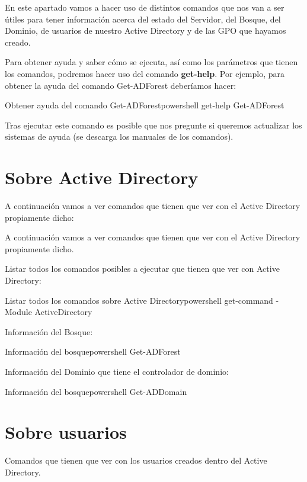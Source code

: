 En este apartado vamos a hacer uso de  distintos comandos que nos van a ser útiles para tener información acerca del estado del Servidor, del Bosque, del Dominio, de usuarios de nuestro Active Directory y de las GPO que hayamos creado.

Para obtener ayuda y saber cómo se ejecuta, así como los parámetros que tienen los comandos, podremos hacer uso del comando \textbf{get-help}. Por ejemplo, para obtener la ayuda del comando Get-ADForest deberíamos hacer:

\begin{mycode}{Obtener ayuda del comando Get-ADForest}{powershell}{}
get-help Get-ADForest
\end{mycode}

Tras ejecutar este comando es posible que nos pregunte si queremos actualizar los sistemas de ayuda (se descarga los manuales de los comandos).

\section{Sobre Active Directory}

A continuación  vamos a ver comandos que tienen que ver con el Active Directory propiamente dicho:

A continuación  vamos a ver comandos que tienen que ver con el Active Directory propiamente dicho.

Listar todos los comandos posibles a ejecutar que tienen que ver con Active Directory:


\begin{mycode}{Listar todos los comandos sobre Active Directory}{powershell}{}
get-command -Module ActiveDirectory
\end{mycode}


Información del Bosque:
\begin{mycode}{Información del bosque}{powershell}{}
Get-ADForest
\end{mycode}


Información del Dominio que tiene el controlador de dominio:
\begin{mycode}{Información del bosque}{powershell}{}
Get-ADDomain
\end{mycode}


\section{Sobre usuarios}

Comandos que tienen que ver con los usuarios creados dentro del Active Directory.

